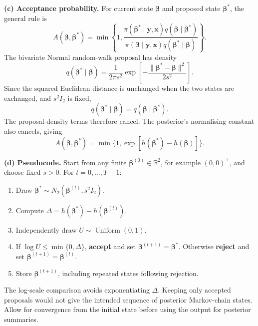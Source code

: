 \documentclass[11pt,a4paper]{article}
\newcommand{\given}{\mathrel{|}}
\newcommand{\xvec}{\boldsymbol{x}}
\begin{document}
\textbf{(c) Acceptance probability.}
For current state $\boldsymbol\beta$ and proposed state
$\boldsymbol\beta^*$, the general rule is
\[
A(\boldsymbol\beta,\boldsymbol\beta^*)
=\min\left\{1,
\frac{\pi(\boldsymbol\beta^*\given\mathbf y,\xvec)
      q(\boldsymbol\beta\given\boldsymbol\beta^*)}
     {\pi(\boldsymbol\beta\given\mathbf y,\xvec)
      q(\boldsymbol\beta^*\given\boldsymbol\beta)}\right\}.
\]
The bivariate Normal random-walk proposal has density
\[
q(\boldsymbol\beta^*\given\boldsymbol\beta)
=\frac1{2\pi s^2}
\exp\left[-\frac{\|\boldsymbol\beta^*-\boldsymbol\beta\|^2}{2s^2}\right].
\]
Since the squared Euclidean distance is unchanged when the two states
are exchanged, and $s^2I_2$ is fixed,
\[
q(\boldsymbol\beta^*\given\boldsymbol\beta)
=q(\boldsymbol\beta\given\boldsymbol\beta^*).
\]
The proposal-density terms therefore cancel. The posterior's normalising
constant also cancels, giving
\[
\boxed{
A(\boldsymbol\beta,\boldsymbol\beta^*)
=\min\{1,\exp[h(\boldsymbol\beta^*)-h(\boldsymbol\beta)]\}.
}
\]

\textbf{(d) Pseudocode.}
Start from any finite $\boldsymbol\beta^{(0)}\in\mathbb R^2$, for example
$(0,0)^\top$, and choose fixed $s>0$. For $t=0,\ldots,T-1$:
\begin{enumerate}[label=\arabic*.]
  \item Draw $\boldsymbol\beta^*\sim
        N_2(\boldsymbol\beta^{(t)},s^2I_2)$.
  \item Compute $\Delta=h(\boldsymbol\beta^*)-h(\boldsymbol\beta^{(t)})$.
  \item Independently draw $U\sim\operatorname{Uniform}(0,1)$.
  \item If $\log U\le\min\{0,\Delta\}$, \textbf{accept} and set
        $\boldsymbol\beta^{(t+1)}=\boldsymbol\beta^*$.
        Otherwise \textbf{reject} and set
        $\boldsymbol\beta^{(t+1)}=\boldsymbol\beta^{(t)}$.
  \item Store $\boldsymbol\beta^{(t+1)}$, including repeated states
        following rejection.
\end{enumerate}
The log-scale comparison avoids exponentiating $\Delta$. Keeping only
accepted proposals would not give the intended sequence of posterior
Markov-chain states. Allow for convergence from the initial state before
using the output for posterior summaries.
\end{document}
